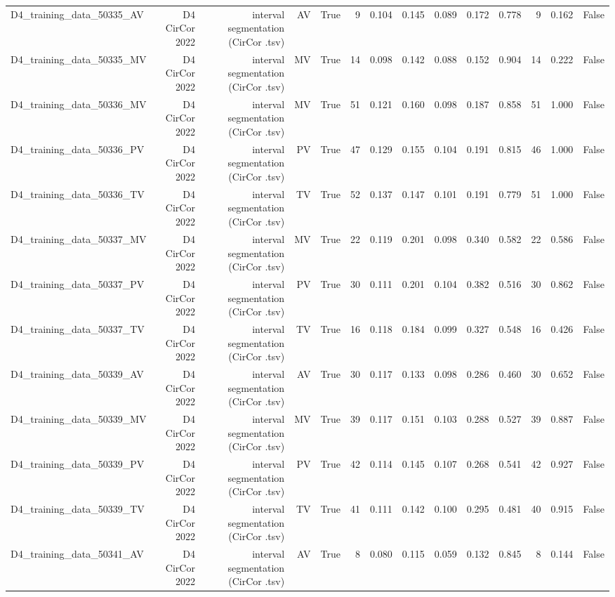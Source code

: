 \begin{table}[htbp]
\begin{tabular}{lrrrrrrrrrrrrr}
    D4\_training\_data\_50335\_AV & D4 CirCor 2022 & interval segmentation (CirCor .tsv) & AV & True & 9 & 0.104 & 0.145 & 0.089 & 0.172 & 0.778 & 9 & 0.162 & False \\
    D4\_training\_data\_50335\_MV & D4 CirCor 2022 & interval segmentation (CirCor .tsv) & MV & True & 14 & 0.098 & 0.142 & 0.088 & 0.152 & 0.904 & 14 & 0.222 & False \\
    D4\_training\_data\_50336\_MV & D4 CirCor 2022 & interval segmentation (CirCor .tsv) & MV & True & 51 & 0.121 & 0.160 & 0.098 & 0.187 & 0.858 & 51 & 1.000 & False \\
    D4\_training\_data\_50336\_PV & D4 CirCor 2022 & interval segmentation (CirCor .tsv) & PV & True & 47 & 0.129 & 0.155 & 0.104 & 0.191 & 0.815 & 46 & 1.000 & False \\
    D4\_training\_data\_50336\_TV & D4 CirCor 2022 & interval segmentation (CirCor .tsv) & TV & True & 52 & 0.137 & 0.147 & 0.101 & 0.191 & 0.779 & 51 & 1.000 & False \\
    D4\_training\_data\_50337\_MV & D4 CirCor 2022 & interval segmentation (CirCor .tsv) & MV & True & 22 & 0.119 & 0.201 & 0.098 & 0.340 & 0.582 & 22 & 0.586 & False \\
    D4\_training\_data\_50337\_PV & D4 CirCor 2022 & interval segmentation (CirCor .tsv) & PV & True & 30 & 0.111 & 0.201 & 0.104 & 0.382 & 0.516 & 30 & 0.862 & False \\
    D4\_training\_data\_50337\_TV & D4 CirCor 2022 & interval segmentation (CirCor .tsv) & TV & True & 16 & 0.118 & 0.184 & 0.099 & 0.327 & 0.548 & 16 & 0.426 & False \\
    D4\_training\_data\_50339\_AV & D4 CirCor 2022 & interval segmentation (CirCor .tsv) & AV & True & 30 & 0.117 & 0.133 & 0.098 & 0.286 & 0.460 & 30 & 0.652 & False \\
    D4\_training\_data\_50339\_MV & D4 CirCor 2022 & interval segmentation (CirCor .tsv) & MV & True & 39 & 0.117 & 0.151 & 0.103 & 0.288 & 0.527 & 39 & 0.887 & False \\
    D4\_training\_data\_50339\_PV & D4 CirCor 2022 & interval segmentation (CirCor .tsv) & PV & True & 42 & 0.114 & 0.145 & 0.107 & 0.268 & 0.541 & 42 & 0.927 & False \\
    D4\_training\_data\_50339\_TV & D4 CirCor 2022 & interval segmentation (CirCor .tsv) & TV & True & 41 & 0.111 & 0.142 & 0.100 & 0.295 & 0.481 & 40 & 0.915 & False \\
    D4\_training\_data\_50341\_AV & D4 CirCor 2022 & interval segmentation (CirCor .tsv) & AV & True & 8 & 0.080 & 0.115 & 0.059 & 0.132 & 0.845 & 8 & 0.144 & False \\

\end{tabular}
\end{table}
